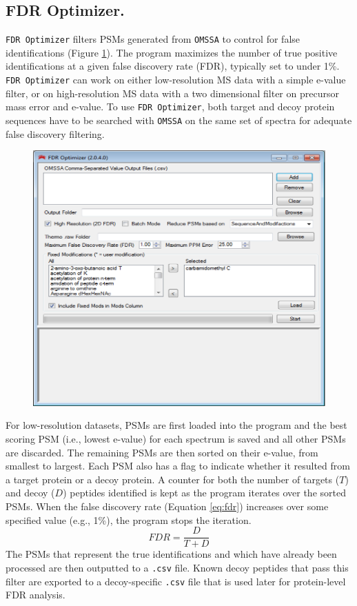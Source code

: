 \subsection*{FDR Optimizer.}
\texttt{FDR Optimizer} filters PSMs generated from \texttt{OMSSA} to control for false identifications (Figure \ref{fig:fdr}). The program maximizes the number of true positive identifications at a given false discovery rate (FDR), typically set to under 1\%. \texttt{FDR Optimizer} can work on either low-resolution MS data with a simple e-value filter, or on high-resolution MS data with a two dimensional filter on precursor mass error and e-value. To use \texttt{FDR Optimizer}, both target and decoy protein sequences have to be searched with \texttt{OMSSA} on the same set of spectra for adequate false discovery filtering. 
\begin{figure}[p]
	\centering
	\includegraphics[width=\columnwidth]{csmsl/fdr.png}
	\label{fig:fdr}
\end{figure}

For low-resolution datasets, PSMs are first loaded into the program and the best scoring PSM (i.e., lowest e-value) for each spectrum is saved and all other PSMs are discarded. The remaining PSMs are then sorted on their e-value, from smallest to largest. Each PSM also has a flag to indicate whether it resulted from a target protein or a decoy protein. A counter for both the number of targets ($T$) and decoy ($D$) peptides identified is kept as the program iterates over the sorted PSMs. When the false discovery rate (Equation \ref{eq:fdr}) increases over some specified value (e.g., 1\%), the program stops the iteration.
\begin{equation}
FDR =\frac{D}{T + D}
\label{eq:fdr}
\end{equation}
The PSMs that represent the true identifications and which have already been processed are then outputted to a \texttt{.csv} file. Known decoy peptides that pass this filter are exported to a decoy-specific \texttt{.csv} file that is used later for protein-level FDR analysis.

